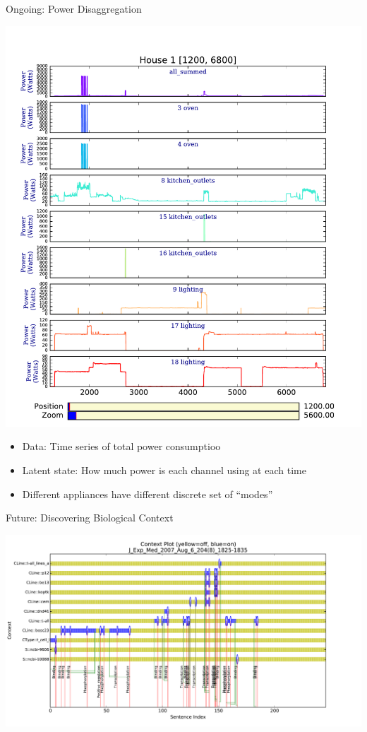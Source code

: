 \documentclass[11pt, mathserif, handout, table]{beamer}
\begin{document}
\begin{frame}{Ongoing: Power Disaggregation}
\begin{minipage}{0.45\textwidth}
  \includegraphics[width=\textwidth]{img/redd_data.pdf}
\end{minipage}
\hspace{0.1in}
\begin{minipage}{0.45\textwidth}
  \begin{itemize}
  \item Data: Time series of total power consumptioo 
  \item Latent state: How much power is each channel using at each
    time
  \item Different appliances have different discrete set of ``modes''
  \end{itemize}
\end{minipage}
\end{frame}

\begin{frame}{Future: Discovering Biological Context}
  \begin{center}
    \includegraphics[width=\textwidth]{img/bio_contexts.pdf}
  \end{center}
\end{frame}
\end{document}
